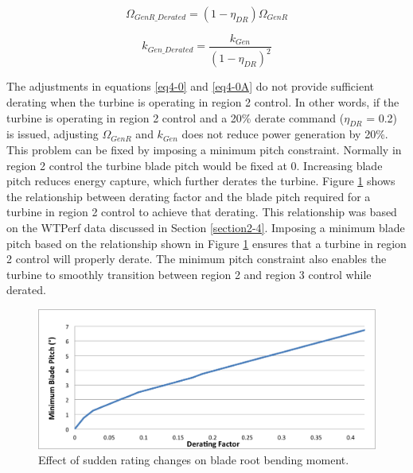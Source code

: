 \begin{equation}
	\Omega_{GenR\_Derated}=(1-\eta_{DR})\Omega_{GenR} \label{eq4-0}
\end{equation}

\begin{equation}
	k_{Gen\_Derated}=\dfrac{k_{Gen}}{(1-\eta_{DR})^2} \label{eq4-0A}
\end{equation}

The adjustments in equations \ref{eq4-0} and \ref{eq4-0A} do not provide sufficient derating when the turbine is operating in region 2 control. In other words, if the turbine is operating in region 2 control and a 20\% derate command ($\eta_{DR}$ = 0.2) is issued, adjusting $\Omega_{GenR}$ and $k_{Gen}$ does not reduce power generation by 20\%. This problem can be fixed by imposing a minimum pitch constraint. Normally in region 2 control the turbine blade pitch would be fixed at 0\degree. Increasing blade pitch reduces energy capture, which further derates the turbine. Figure \ref{fig4-4A} shows the relationship between derating factor and the blade pitch required for a turbine in region 2 control to achieve that derating. This relationship was based on the WTPerf data discussed in Section \ref{section2-4}. Imposing a minimum blade pitch based on the relationship shown in Figure \ref{fig4-4A} ensures that a turbine in region 2 control will properly derate. The minimum pitch constraint also enables the turbine to smoothly transition between region 2 and region 3 control while derated. 

\begin{figure}[htb]
	\centering
		\includegraphics[width = \linewidth]{Figures/ch4Figures/fig4-4A.png}
	\caption{Effect of sudden rating changes on blade root bending moment.}
	\label{fig4-4A}
\end{figure}






